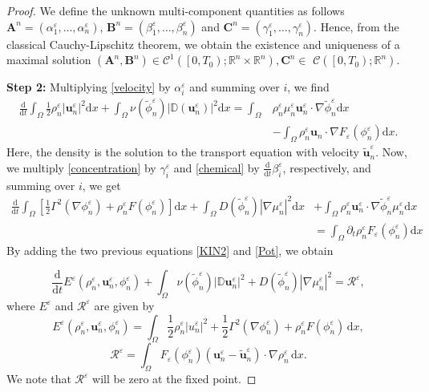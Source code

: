 \documentclass[11pt]{article}
\def\bq{\begin{equation}}
\def\eq{\end{equation}}
\def\bfu{\mathbf{u}}
\def\md{\mathrm{d}}
\def\bq{\begin{equation}}
\def\eq{\end{equation}}
\def\Ga{\Gamma}
\begin{document}
\begin{proof}
We define the unknown multi-component quantities as follows
$\mathbf{A}^n = (\alpha_1^{\varepsilon},\ldots,\alpha_n^{\varepsilon})$, $\mathbf{B}^n = (\beta_1^{\varepsilon},\ldots,\beta_n^{\varepsilon})$ and $\mathbf{C}^n = (\gamma_1^{\varepsilon},\ldots,\gamma_n^{\varepsilon})$. Hence, from the classical Cauchy-Lipschitz theorem, we obtain the existence and uniqueness of a maximal solution
$\left(\mathbf{A}^n, \mathbf{B}^n\right) \in \mathcal{C}^1\left(\left[0, T_0\right); \mathbb{R}^n \times \mathbb{R}^n\right), \mathbf{C}^n \in$ $\mathcal{C}\left(\left[0, T_0\right) ; \mathbb{R}^n\right)$.

\textbf{Step 2:} Multiplying \eqref{velocity} by $\alpha_i^{\varepsilon}$ and summing over $i$, we find
\bq
\begin{aligned}
\frac{ \md}{ \md t}\int_{\Omega} \frac{1}{2}\rho_n^{\varepsilon} |\bfu_n^{\varepsilon}|^2 \md x + \int_{\Omega}\nu(\widetilde{\phi}_n^{\varepsilon})|\mathbb{D}(\bfu_n^{\varepsilon})|^2 \md x=\int_{\Omega}& \rho_n^{\varepsilon} \mu_n^{\varepsilon} \bfu_n^{\varepsilon}\cdot\nabla\widetilde{\phi}_n^{\varepsilon}\md x \\
&-\int_{\Omega} \rho_n^{\varepsilon} \bfu_n\cdot\nabla F_{\varepsilon}(\phi_n^{\varepsilon})\md x.\label{KIN2}
\end{aligned}
\eq
Here, the density is the solution to the transport equation with velocity $\widetilde{\bfu}^{\varepsilon}_n$. Now, we multiply
\eqref{concentration} by $\gamma_i^{\varepsilon}$ and \eqref{chemical} by $\frac{\md }{\md t} \beta_i^{\varepsilon}$, respectively, and summing over $i$, we get
\bq 
\begin{aligned}
\frac{\md }{\md t} \int_{\Omega} \left[\frac{1}{2}\Ga^2(\nabla\phi_n^{\varepsilon}) + \rho_n^{\varepsilon} F(\phi_n^{\varepsilon})\right] \md x +\int_{\Omega}D(\widetilde{\phi}_n^{\varepsilon})|\nabla\mu_n^{\varepsilon}|^2 \md x &+ \int_{\Omega}\rho_n^{\varepsilon} \bfu_n^{\varepsilon}\cdot\nabla\widetilde{\phi}_n^{\varepsilon}\mu_n^{\varepsilon}\md x \\
&= \int_{\Omega} \partial_t \rho_n^{\varepsilon} F_{\varepsilon}(\phi_n^{\varepsilon})\md x\label{Pot}
\end{aligned}
\eq
By adding the two previous equations \eqref{KIN2} and \eqref{Pot}, we obtain 

\bq
\frac{\md }{\md t} E^{\varepsilon}(\rho_n^{\varepsilon},\bfu_n^{\varepsilon},\phi_n^{\varepsilon}) + \int_{\Omega} \nu(\widetilde{\phi}_n^{\varepsilon})|\mathbb{D}\bfu_n^{\varepsilon}|^2 + D(\widetilde{\phi}_n^{\varepsilon})|\nabla \mu_n^{\varepsilon}|^2 = \mathcal{R}^{\varepsilon},\label{Energy_Rest}
\eq
where $E^{\varepsilon}$ and $\mathcal{R}^{\varepsilon}$ are given by
\bq
E^{\varepsilon}(\rho_n^{\varepsilon},\bfu_n^{\varepsilon},\phi_n^{\varepsilon}) = \int_{\Omega} \frac{1}{2} \rho_n^{\varepsilon} |u_n^{\varepsilon}|^2 + \frac{1}{2}\Ga^2(\nabla\phi_n^{\varepsilon}) + \rho_n^{\varepsilon} F(\phi_n^{\varepsilon}) \,\md x,\eq
\bq
\mathcal{R}^{\varepsilon} = \int_{\Omega} F_{\varepsilon}(\phi_n^{\varepsilon})(\bfu_n^{\varepsilon} - \widetilde{\bfu}_n^{\varepsilon})\cdot\nabla\rho_n^{\varepsilon} \,\md x.
\eq
We note that $\mathcal{R}^{\varepsilon}$ will be zero at the fixed point. 


\end{proof}
\end{document}
